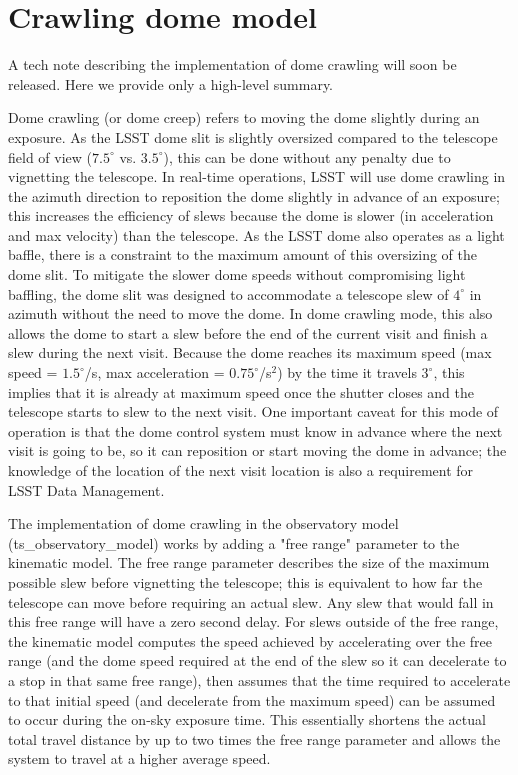 \documentclass[DM,authoryear,toc]{lsstdoc}
\begin{document}
\section{Crawling dome model}

 A tech note describing the implementation of dome crawling will soon be released. Here we provide only a high-level summary.
 
Dome crawling (or dome creep) refers to moving the dome slightly during an exposure. As the LSST dome slit is slightly oversized 
compared to the telescope field of view ($7.5^{\circ}$ vs. $3.5^{\circ}$), this can be done without any penalty due to vignetting the telescope. 
In real-time operations, LSST will use dome crawling in the azimuth direction to reposition the dome slightly in advance of an exposure; this 
increases the efficiency of slews because the dome is slower (in acceleration and max velocity) than the telescope. 
As the LSST dome also operates as a light baffle, there is a constraint to the maximum amount of this oversizing of the dome slit. 
To mitigate the slower dome speeds without compromising light baffling, the dome slit was designed to accommodate a telescope slew of 
$4^\circ$ in azimuth without the need to move the dome. In dome crawling mode, this also allows the dome to start a slew before the end
of the current visit and finish a slew during the next visit. Because the dome reaches its maximum speed (max speed = $1.5^\circ$/s,
max acceleration = $0.75^\circ$/s$^2$) by the time it travels $3^\circ$, this implies that it is already at maximum speed once the shutter closes
and the telescope starts to slew to the next visit. One important caveat for this mode of operation is that the dome control
system must know in advance where the next visit is going to be, so it can reposition or start moving the dome in advance; the knowledge
of the location of the next visit location is also a requirement for LSST Data Management.

The implementation of dome crawling in the observatory model (ts\_observatory\_model) works by adding a "free range" parameter to the kinematic model.
The free range parameter describes the size of the maximum possible slew before vignetting the telescope; this is equivalent to how 
far the telescope can move before requiring an actual slew. Any slew that would fall in this free range will have a
zero second delay. For slews outside of the free range, the kinematic model computes the speed achieved by accelerating over the free range 
(and the dome speed required at the end of the slew so it can decelerate to a stop in that same free range), then assumes that the time required to 
accelerate to that initial speed (and decelerate from the maximum speed) can be assumed to occur during the on-sky exposure time.  
This essentially shortens the actual total travel distance by up to two times the free range parameter and allows the system to travel at a higher average speed. 
\end{document}
